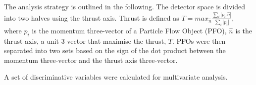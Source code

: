 \documentclass[a4paper,11pt]{article}
\begin{document}

The analysis strategy is outlined in the following. The detector space is divided into two halves using the thrust axis. Thrust is defined as 
$T = max_{\hat{n}} \frac {\sum_i \left| p_i . \hat{n} \right|}{\sum_i \left| p_i \right|}$, where  $p_i$ is the momentum three-vector of a Particle Flow Object (PFO), $\hat{n}$ is the thrust axis, a unit 3-vector that maximise the thrust, $T$. PFOs were then separated into two sets based on the sign of the dot product between the momentum three-vector and the thrust axis three-vector.


A set of discriminative variables were calculated for multivariate analysis.
\end{document}
